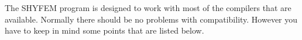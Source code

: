 
%
%
%
%
%
%
%

The SHYFEM program is designed to work with most of the compilers
that are available. Normally there should be no problems with
compatibility. However you have to keep in mind some points that are
listed below.

